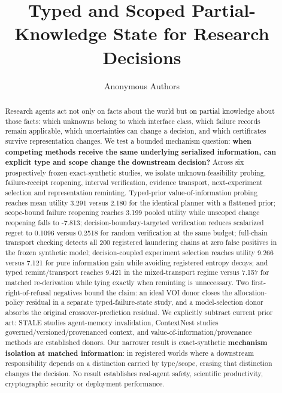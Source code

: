 \documentclass[10pt]{article}
\title{Typed and Scoped Partial-Knowledge State for Research Decisions}
\author{Anonymous Authors}
\date{}
\begin{document}
\maketitle

\begin{abstract}
Research agents act not only on facts about the world but on partial
knowledge about those facts: which unknowns belong to which interface
class, which failure records remain applicable, which uncertainties can
change a decision, and which certificates survive representation
changes. We test a bounded mechanism question: \textbf{when competing
methods receive the same underlying serialized information, can explicit
type and scope change the downstream decision?} Across six prospectively
frozen exact-synthetic studies, we isolate unknown-feasibility probing,
failure-receipt reopening, interval verification, evidence transport,
next-experiment selection and representation reminting. Typed-prior
value-of-information probing reaches mean utility 3.291 versus 2.180 for
the identical planner with a flattened prior; scope-bound failure
reopening reaches 3.199 pooled utility while unscoped change reopening
falls to -7.813; decision-boundary-targeted verification reduces
scalarized regret to 0.1096 versus 0.2518 for random verification at the
same budget; full-chain transport checking detects all 200 registered
laundering chains at zero false positives in the frozen synthetic model;
decision-coupled experiment selection reaches utility 9.266 versus 7.121
for pure information gain while avoiding registered entropy decoys; and
typed remint/transport reaches 9.421 in the mixed-transport regime
versus 7.157 for matched re-derivation while tying exactly when
reminting is unnecessary. Two first-right-of-refusal negatives bound the
claim: an ideal VOI donor closes the allocation-policy residual in a
separate typed-failure-state study, and a model-selection donor absorbs
the original crossover-prediction residual. We explicitly subtract
current prior art: STALE \citep{chao2026stale} studies agent-memory
invalidation, ContextNest \citep{sulpovar2026contextnest} studies
governed/versioned/provenanced context, and
value-of-information/provenance methods are established donors. Our
narrower result is exact-synthetic \textbf{mechanism isolation at
matched information}: in registered worlds where a downstream
responsibility depends on a distinction carried by type/scope, erasing
that distinction changes the decision. No result establishes real-agent
safety, scientific productivity, cryptographic security or deployment
performance.
\end{abstract}
\end{document}
